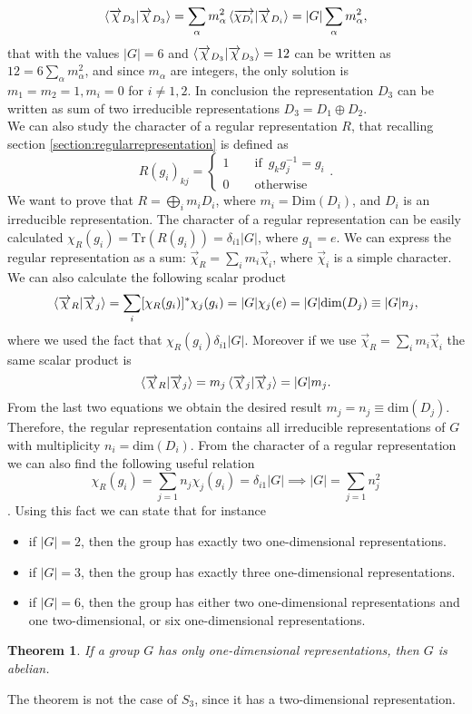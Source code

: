 \documentclass[12pt]{book}
\theoremstyle{plain}
\newtheorem{thm}{Theorem}[section]
\theoremstyle{definition}
\theoremstyle{remark}
\begin{document}
\[\braket{\overrightarrow{\chi}_{D_3}|\overrightarrow{\chi}_{D_3}} = \sum_\alpha m_\alpha^2 \braket{\overrightarrow{\chi_{D_i}}|\overrightarrow{\chi}_{D_i}} = |G|\sum_{\alpha}m_\alpha^2, \]
that with the values $|G| = 6$ and $\braket{\overrightarrow{\chi}_{D_3}|\overrightarrow{\chi}_{D_3}}=12$ can be written as $12 = 6\sum_{\alpha}m_\alpha^2$, and since $m_\alpha$ are integers, the only solution is $m_1 = m_2 = 1, m_i = 0$ for $i\neq 1,2$. In conclusion the representation $D_3$ can be written as sum of two irreducible representations $D_3 = D_1 \oplus D_2$.\\
We can also study the character of a regular representation $R$, that recalling section \ref{section:regularrepresentation} is defined as
\[R(g_i)_{kj} = \begin{cases}
1\qquad \text{if}\,\,\, g_kg_j^{-1} = g_i\\
0 \qquad \text{otherwise}
\end{cases}.\]
We want to prove that $R = \bigoplus_{i}m_i D_i$, where $m_i = \text{Dim}(D_i)$, and $D_i$ is an irreducible representation. The character of a regular representation can be easily calculated $\chi_R(g_i) = \text{Tr}(R(g_i)) = \delta_{i1}|G|$, where $g_1 = e$. We can express the regular representation as a sum: $\overrightarrow{\chi}_R = \sum_i m_i \overrightarrow{\chi}_i$, where $ \overrightarrow{\chi}_i$ is a simple character. We can also calculate the following scalar product 
\[\braket{\overrightarrow{\chi}_R| \overrightarrow{\chi}_j} = \sum_i [\chi_R(g_i)]^* \chi_j(g_i) = |G| \chi_j(e) = |G|\text{dim}(D_j) \equiv |G| n_j,\]
where we used the fact that $\chi_R(g_i) \delta_{i1}|G|$. Moreover if we use $\overrightarrow{\chi}_R = \sum_i m_i \overrightarrow{\chi}_i$ the same scalar product is
\[\braket{\overrightarrow{\chi}_R| \overrightarrow{\chi}_j} = m_j \braket{\overrightarrow{\chi}_j|\overrightarrow{\chi}_j} =|G| m_j.\]
From the last two equations we obtain the desired result $m_j = n_j \equiv \text{dim}(D_j)$. Therefore, the regular representation contains all irreducible representations of $G$ with multiplicity $n_i = \text{dim}(D_i)$. From the character of a regular representation we can also find the following useful relation
\[\chi_R(g_i) = \sum_{j=1} n_j \chi_j(g_i) = \delta_{i1}|G| \implies |G| = \sum_{j=1} n_j^2\].
Using this fact we can state that for instance
\begin{itemize}
\item if $|G|=2$, then the group has exactly two one-dimensional representations.
\item if $|G| = 3$, then the group has exactly three one-dimensional representations.  
\item if $|G| = 6$, then the group has either two one-dimensional representations and one two-dimensional, or six one-dimensional representations. 
\end{itemize}
\begin{thm}
If a group $G$ has only one-dimensional representations, then $G$ is abelian.
\end{thm}
The theorem is not the case of $S_3$, since it has a two-dimensional representation.
\end{document}
